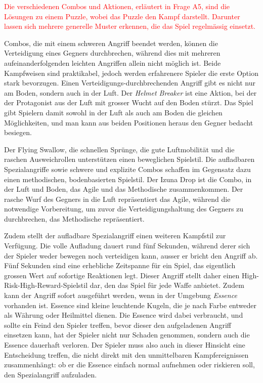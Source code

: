 \documentclass[../Main.tex]{subfiles}
\begin{document}
\textcolor{red}{Die verschiedenen Combos und Aktionen, erläutert in Frage A5, sind die Lösungen zu einem Puzzle, wobei das Puzzle den Kampf darstellt. Darunter lassen sich mehrere generelle Muster erkennen, die das Spiel regelmässig einsetzt.}

Combos, die mit einem schweren Angriff beendet werden, können die Verteidigung eines Gegners durchbrechen, während dies mit mehreren aufeinanderfolgenden leichten Angriffen allein nicht möglich ist. Beide Kampfweisen sind praktikabel, jedoch werden erfahrenere Spieler die erste Option stark bevorzugen. \begingroup\color{red}Einen Verteidigungs-durchbrechenden Angriff gibt es nicht nur am Boden, sondern auch in der Luft. Der \textit{Helmet Breaker} ist eine Aktion, bei der der Protagonist aus der Luft mit grosser Wucht auf den Boden stürzt. Das Spiel gibt Spielern damit sowohl in der Luft als auch am Boden die gleichen Möglichkeiten, und man kann aus beiden Positionen heraus den Gegner bedacht besiegen.

Der Flying Swallow, die schnellen Sprünge, die gute Luftmobilität und die raschen Ausweichrollen unterstützen einen beweglichen Spielstil. Die aufladbaren Spezialangriffe sowie schwere und explizite Combos schaffen im Gegensatz dazu einen methodischen, bodenbasierten Spielstil. Der Izuna Drop ist die Combo, in der Luft und Boden, das Agile und das Methodische zusammenkommen. Der rasche Wurf des Gegners in die Luft repräsentiert das Agile, während die notwendige Vorbereitung, um zuvor die Verteidigungshaltung des Gegners zu durchbrechen, das Methodische repräsentiert.

Zudem stellt der aufladbare Spezialangriff einen weiteren Kampfstil zur Verfügung. Die volle Aufladung dauert rund fünf Sekunden, während derer sich der Spieler weder bewegen noch verteidigen kann, ausser er bricht den Angriff ab. Fünf Sekunden sind eine erhebliche Zeitspanne für ein Spiel, das eigentlich grossen Wert auf sofortige Reaktionen legt. Dieser Angriff stellt daher einen High-Risk-High-Reward-Spielstil dar, den das Spiel für jede Waffe anbietet. Zudem kann der Angriff sofort ausgeführt werden, wenn in der Umgebung \textit{Essence} vorhanden ist. Essence sind kleine leuchtende Kugeln, die je nach Farbe entweder als Währung oder Heilmittel dienen. Die Essence wird dabei verbraucht, und sollte ein Feind den Spieler treffen, bevor dieser den aufgeladenen Angriff einsetzen kann, hat der Spieler nicht nur Schaden genommen, sondern auch die Essence dauerhaft verloren. Der Spieler muss also auch in dieser Hinsicht eine Entscheidung treffen, die nicht direkt mit den unmittelbaren Kampfereignissen zusammenhängt: ob er die Essence einfach normal aufnehmen oder riskieren soll, den Spezialangriff aufzuladen.\endgroup
\end{document}
